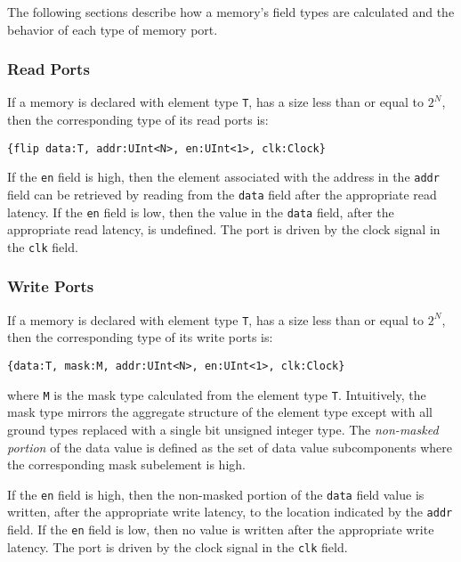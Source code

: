 \documentclass[12pt]{article}
\begin{document}
The following sections describe how a memory's field types are calculated and the behavior of each type of memory port.

\subsubsection{Read Ports}
If a memory is declared with element type \verb|T|, has a size less than or equal to $2^N$, then the corresponding type of its read ports is:
\begin{verbatim}
{flip data:T, addr:UInt<N>, en:UInt<1>, clk:Clock}
\end{verbatim}

If the \verb|en| field is high, then the element associated with the address in the \verb|addr| field can be retrieved by reading from the \verb|data| field after the appropriate read latency. If the \verb|en| field is low, then the value in the \verb|data| field, after the appropriate read latency, is undefined. The port is driven by the clock signal in the \verb|clk| field.

\subsubsection{Write Ports}
If a memory is declared with element type \verb|T|, has a size less than or equal to $2^N$, then the corresponding type of its write ports is:
\begin{verbatim}
{data:T, mask:M, addr:UInt<N>, en:UInt<1>, clk:Clock}
\end{verbatim}
where \verb|M| is the mask type calculated from the element type \verb|T|. Intuitively, the mask type mirrors the aggregate structure of the element type except with all ground types replaced with a single bit unsigned integer type. The {\em non-masked portion} of the data value is defined as the set of data value subcomponents where the corresponding mask subelement is high.

If the \verb|en| field is high, then the non-masked portion of the \verb|data| field value is written, after the appropriate write latency, to the location indicated by the \verb|addr| field. If the \verb|en| field is low, then no value is written after the appropriate write latency. The port is driven by the clock signal in the \verb|clk| field.
\end{document}
